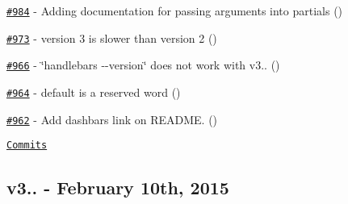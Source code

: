 \begin{DoxyItemize}
\item \href{https://github.com/wycats/handlebars.js/pull/984}{\tt \#984} -\/ Adding documentation for passing arguments into partials (\href{https://api.github.com/users/johneke}{\tt })
\item \href{https://github.com/wycats/handlebars.js/issues/973}{\tt \#973} -\/ version 3 is slower than version 2 (\href{https://api.github.com/users/elover}{\tt })
\item \href{https://github.com/wycats/handlebars.js/issues/966}{\tt \#966} -\/ \char`\"{}handlebars -\/-\/version\char`\"{} does not work with v3.. (\href{https://api.github.com/users/abloomston}{\tt })
\item \href{https://github.com/wycats/handlebars.js/pull/964}{\tt \#964} -\/ default is a reserved word (\href{https://api.github.com/users/grassick}{\tt })
\item \href{https://github.com/wycats/handlebars.js/pull/962}{\tt \#962} -\/ Add dashbars\textquotesingle{} link on R\+E\+A\+D\+ME. (\href{https://api.github.com/users/pismute}{\tt })
\end{DoxyItemize}

\href{https://github.com/wycats/handlebars.js/compare/v3.0.0...v3.0.1}{\tt Commits}

\subsection*{v3.. -\/ February 10th, 2015}


